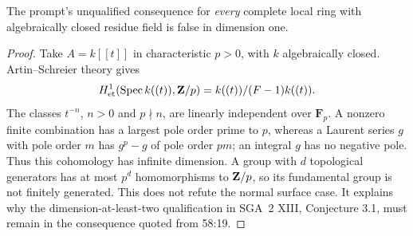 \begin{proposition}
\label{f:dimension}
The prompt's unqualified consequence for \emph{every} complete local
ring with algebraically closed residue field is false in dimension one.
\end{proposition}
\begin{proof}
Take $A=k[[t]]$ in characteristic $p>0$, with $k$ algebraically closed.
Artin--Schreier theory gives
\[
 H^1_{\mathrm{et}}(\operatorname{Spec} k((t)),\mathbf Z/p)
       =k((t))/(F-1)k((t)).
\]
The classes $t^{-n}$, $n>0$ and $p\nmid n$, are linearly independent
over $\mathbf F_p$. A nonzero finite combination has a largest pole
order prime to $p$, whereas a Laurent series $g$ with pole order $m$
has $g^p-g$ of pole order $pm$; an integral $g$ has no negative pole.
Thus this cohomology has infinite dimension. A group with $d$
topological generators has at most $p^d$ homomorphisms to $\mathbf Z/p$,
so its fundamental group is not finitely generated.
This does not refute the normal surface case. It explains why the
dimension-at-least-two qualification in SGA~2 XIII, Conjecture 3.1,
must remain in the consequence quoted from 58:19.
\end{proof}

